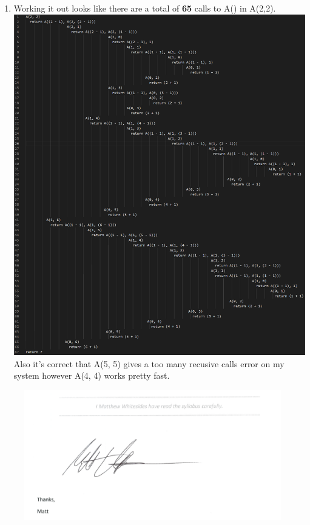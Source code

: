 \documentclass{article}
\begin{document}
\begin{enumerate}
  \item 
    Working it out looks like there are a total of \textbf{65} calls to A() in A(2,2).
    \linebreak
    \includegraphics[width=\linewidth]{7.png}
    \linebreak
    Also it's correct that A(5, 5) gives a too many recusive calls error on my system however A(4, 4) works pretty fast.

\end{enumerate}

\pagebreak

\begin{figure}
  \includegraphics[width=\linewidth]{Statement.png}
  \label{fig:Statement}
\end{figure}
\end{document}
